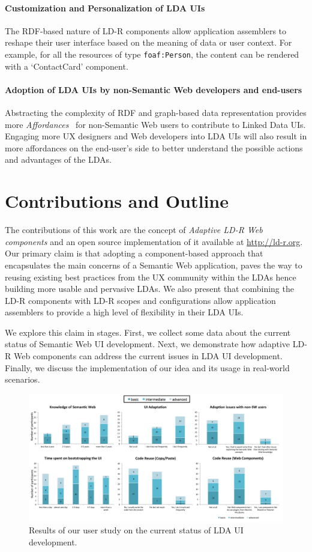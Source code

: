 \documentclass{acm_proc_article-sp}
\begin{document}
\paragraph{Customization and Personalization of LDA UIs} 
The RDF-based nature of LD-R components allow application assemblers to reshape their user interface based on the meaning of data or user context.
For example, for all the resources of type \texttt{foaf:Person}, the content can be rendered with a `ContactCard' component.

\paragraph{Adoption of LDA UIs by non-Semantic Web developers and end-users} 
Abstracting the complexity of RDF and graph-based data representation provides more \emph{Affordances}~\cite{Norman2013} for non-Semantic Web users to contribute to Linked Data UIs.
Engaging more UX designers and Web developers into LDA UIs will also result in more affordances on the end-user's side to better understand the possible actions and advantages of the LDAs.

\section{Contributions and Outline}
The contributions of this work are the concept of \emph{Adaptive LD-R Web components} and an open source implementation of it available at \url{http://ld-r.org}.
Our primary claim is that adopting a component-based approach that encapsulates the main concerns of a Semantic Web application, paves the way to reusing existing best practices from the UX community within the LDAs hence building more usable and pervasive LDAs.
We also present that combining the LD-R components with LD-R scopes and configurations allow application assemblers to provide a high level of flexibility in their LDA UIs.

We explore this claim in stages.
First, we collect some data about the current status of Semantic Web UI development.
Next, we demonstrate how adaptive LD-R Web components can address the current issues in LDA UI development.
Finally, we discuss the implementation of our idea and its usage in real-world scenarios.

\begin{figure}[tb]
  \includegraphics[width=1\linewidth]{images/userstudy.pdf}
  \caption{Results of our user study on the current status of LDA UI development.}
  \label{fig:userstudy}
\end{figure}
\end{document}
